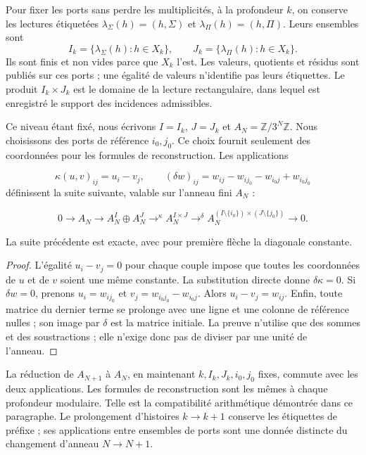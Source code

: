 Pour fixer les ports sans perdre les multiplicités, à la profondeur \(k\), on conserve les lectures étiquetées \(\lambda_\Sigma(h)=(h,\Sigma)\) et \(\lambda_\Pi(h)=(h,\Pi)\). Leurs ensembles sont
\[
I_k=\{\lambda_\Sigma(h):h\in X_k\},\qquad
J_k=\{\lambda_\Pi(h):h\in X_k\}.
\]
Ils sont finis et non vides parce que \(X_k\) l’est. Les valeurs, quotients et résidus sont publiés sur ces ports ; une égalité de valeurs n’identifie pas leurs étiquettes. Le produit \(I_k\times J_k\) est le domaine de la lecture rectangulaire, dans lequel est enregistré le support des incidences admissibles.

Ce niveau étant fixé, nous écrivons \(I=I_k\), \(J=J_k\) et \(A_N=\mathbb Z/3^N\mathbb Z\). Nous choisissons des ports de référence \(i_0,j_0\). Ce choix fournit seulement des coordonnées pour les formules de reconstruction. Les applications

\[
\kappa(u,v)_{ij}=u_i-v_j,
\qquad
(\delta w)_{ij}=w_{ij}-w_{ij_0}-w_{i_0j}+w_{i_0j_0}
\]
définissent la suite suivante, valable sur l'anneau fini \(A_N\) :

\[
0\longrightarrow A_N\longrightarrow
A_N^I\oplus A_N^J\mathrel{\mathop{\longrightarrow}^{\kappa}}
A_N^{I\times J}\mathrel{\mathop{\longrightarrow}^{\delta}}
A_N^{(I\setminus\{i_0\})\times(J\setminus\{j_0\})}
\longrightarrow0.
\]
\begin{proposition}
\label{x_reciprocidad:iv:cont:rectangular-exacta}
La suite précédente est exacte, avec pour première flèche la diagonale constante.

\end{proposition}
\begin{proof}
L'égalité \(u_i-v_j=0\) pour chaque couple impose que toutes les coordonnées de \(u\) et de \(v\) soient une même constante. La substitution directe donne \(\delta\kappa=0\). Si \(\delta w=0\), prenons \(u_i=w_{ij_0}\) et \(v_j=w_{i_0j_0}-w_{i_0j}\). Alors \(u_i-v_j=w_{ij}\). Enfin, toute matrice du dernier terme se prolonge avec une ligne et une colonne de référence nulles ; son image par \(\delta\) est la matrice initiale. La preuve n'utilise que des sommes et des soustractions ; elle n'exige donc pas de diviser par une unité de l'anneau.
\end{proof}

La réduction de \(A_{N+1}\) à \(A_N\), en maintenant \(k,I_k,J_k,i_0,j_0\) fixes, commute avec les deux applications. Les formules de reconstruction sont les mêmes à chaque profondeur modulaire. Telle est la compatibilité arithmétique démontrée dans ce paragraphe. Le prolongement d’histoires \(k\to k+1\) conserve les étiquettes de préfixe ; ses applications entre ensembles de ports sont une donnée distincte du changement d’anneau \(N\to N+1\).

